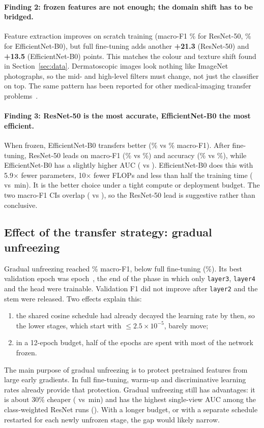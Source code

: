 \paragraph{Finding 2: frozen features are not enough; the domain shift has to be bridged.} Feature extraction
improves on scratch training (macro-F1 \RFrozenFOne\% for ResNet-50, \EFrozenFOne\% for EfficientNet-B0), but
full fine-tuning adds another \textbf{+21.3} (ResNet-50) and \textbf{+13.5} (EfficientNet-B0) points. This matches
the colour and texture shift found in Section~\ref{sec:data}. Dermatoscopic images look nothing like ImageNet
photographs, so the mid- and high-level filters must change, not just the classifier on top. The same pattern has
been reported for other medical-imaging transfer problems~\cite{raghu2019}.

\paragraph{Finding 3: ResNet-50 is the most accurate, EfficientNet-B0 the most efficient.} When frozen,
EfficientNet-B0 transfers better (\EFrozenFOne\% vs \RFrozenFOne\% macro-F1). After fine-tuning, ResNet-50 leads on
macro-F1 (\RFineFOne\% vs \EFineFOne\%) and accuracy (\RFineAcc\% vs \EFineAcc\%), while EfficientNet-B0 has a
slightly higher AUC (\EFineAUC{} vs \RFineAUC). EfficientNet-B0 does this with 5.9$\times$ fewer parameters,
10$\times$ fewer FLOPs and less than half the training time (\EFineTrainMin{} vs \RFineTrainMin\,min). It is the
better choice under a tight compute or deployment budget. The two macro-F1 CIs overlap (\EFineFOneCI{} vs
\RFineFOneCI), so the ResNet-50 lead is suggestive rather than conclusive.

\subsection{Effect of the transfer strategy: gradual unfreezing}
Gradual unfreezing reached \RGradFOne\% macro-F1, below full fine-tuning (\RFineFOne\%). Its best validation
epoch was epoch~\RGradBestEpoch, the end of the phase in which only \texttt{layer3}, \texttt{layer4} and the head
were trainable. Validation F1 did not improve after \texttt{layer2} and the stem were released. Two effects
explain this:
\begin{enumerate}
  \item the shared cosine schedule had already decayed the learning rate by then, so the lower stages, which
        start with $\le 2.5\times10^{-5}$, barely move;
  \item in a 12-epoch budget, half of the epochs are spent with most of the network frozen.
\end{enumerate}
The main purpose of gradual unfreezing is to protect pretrained features from large early gradients. In full
fine-tuning, warm-up and discriminative learning rates already provide that protection. Gradual unfreezing still
has advantages: it is about 30\% cheaper (\RGradTrainMin{} vs \RFineTrainMin\,min) and has the highest
single-view AUC among the class-weighted ResNet runs (\RGradAUC). With a longer budget, or with a separate
schedule restarted for each newly unfrozen stage, the gap would likely narrow.

